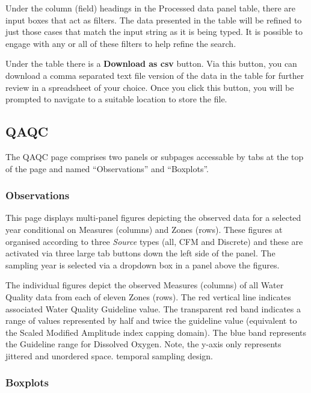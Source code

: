 \documentclass[
  8pt,
  a4paper]{article}
\begin{document}
Under the column (field) headings in the Processed data panel table,
there are input boxes that act as filters. The data presented in the
table will be refined to just those cases that match the input string as
it is being typed. It is possible to engage with any or all of these
filters to help refine the search.

Under the table there is a \textbf{Download as csv} button. Via this
button, you can download a comma separated text file version of the data
in the table for further review in a spreadsheet of your choice. Once
you click this button, you will be prompted to navigate to a suitable
location to store the file.

\subsection{QAQC}\label{qaqc}

The QAQC page comprises two panels or subpages accessable by tabs at the
top of the page and named ``Observations'' and ``Boxplots''.

\subsubsection{Observations}\label{observations}

This page displays multi-panel figures depicting the observed data for a
selected year conditional on Measures (columns) and Zones (rows). These
figures at organised according to three \emph{Source} types (all, CFM
and Discrete) and these are activated via three large tab buttons down
the left side of the panel. The sampling year is selected via a dropdown
box in a panel above the figures.

The individual figures depict the observed Measures (columns) of all
Water Quality data from each of eleven Zones (rows). The red vertical
line indicates associated Water Quality Guideline value. The transparent
red band indicates a range of values represented by half and twice the
guideline value (equivalent to the Scaled Modified Amplitude index
capping domain). The blue band represents the Guideline range for
Dissolved Oxygen. Note, the y-axis only represents jittered and
unordered space. temporal sampling design.

\subsubsection{Boxplots}\label{boxplots}
\end{document}
